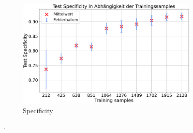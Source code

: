 \begin{figure}[htbp]
  \begin{subfigure}[b]{0.48\textwidth}
    \centering
    \includegraphics[width=\textwidth]{plots/Augm-Gli-Men_Specificity_mean.pdf}
    \caption{Specificity}
    \label{fig:augm-spec}
  \end{subfigure}
  \caption{.}
  \label{fig:gli-men-augm}
\end{figure}


